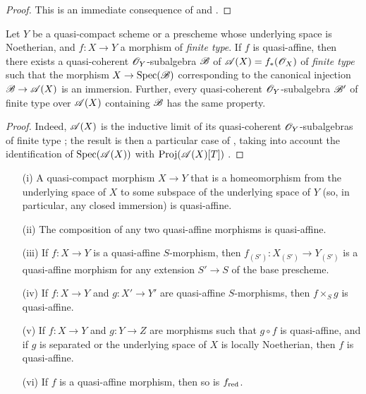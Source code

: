 \begin{proof}
\label{proof-II.5.1.8}
This is an immediate consequence of  and .
\end{proof}

\begin{corollary}[5.1.9]
\label{II.5.1.9}
Let $Y$ be a quasi-compact scheme or a prescheme whose underlying space is Noetherian, and $f:X\to Y$ a morphism of \emph{finite type}.
If $f$ is quasi-affine, then there exists a quasi-coherent $\mathscr{O}_Y$-subalgebra $\mathscr{B}$ of $\mathscr{A}(X)=f_*(\mathscr{O}_X)$ of \emph{finite type}  such that the morphism $X\to\Spec(\sh{B})$ corresponding to the canonical injection $\sh{B}\to\sh{A}(X)$ is an immersion.
Further, every quasi-coherent $\mathscr{O}_Y$-subalgebra $\mathscr{B}'$ of finite type over $\mathscr{A}(X)$ containing $\mathscr{B}$ has the same property.
\end{corollary}

\begin{proof}
\label{proof-II.5.1.9}
Indeed, $\mathscr{A}(X)$ is the inductive limit of its quasi-coherent $\mathscr{O}_Y$-subalgebras of finite type ;
the result is then a particular case of , taking into account the identification of $\operatorname{Spec}(\mathscr{A}(X))$ with $\operatorname{Proj}(\mathscr{A}(X)[T])$ .
\end{proof}

\begin{proposition}[5.1.10]
\label{II.5.1.10}
\medskip\noindent
\begin{enumerate}
  \item[{\rm(i)}] A quasi-compact morphism $X\to Y$ that is a homeomorphism from the underlying space of $X$ to some subspace of the underlying space of $Y$ (so, in particular, any closed immersion) is quasi-affine.
  \item[{\rm(ii)}] The composition of any two quasi-affine morphisms is quasi-affine.
  \item[{\rm(iii)}] If $f:X\to Y$ is a quasi-affine $S$-morphism, then $f_{(S')}:X_{(S')}\to Y_{(S')}$ is a quasi-affine morphism for any extension $S'\to S$ of the base prescheme.
  \item[{\rm(iv)}] If $f:X\to Y$ and $g:X'\to Y'$ are quasi-affine $S$-morphisms, then $f\times_S g$ is quasi-affine.
  \item[{\rm(v)}] If $f:X\to Y$ and $g:Y\to Z$ are morphisms such that $g\circ f$ is quasi-affine, and if $g$ is separated or the underlying space of $X$ is locally Noetherian, then $f$ is quasi-affine.
  \item[{\rm(vi)}] If $f$ is a quasi-affine morphism, then so is $f_{\mathrm{red}}$.
\end{enumerate}
\end{proposition}

